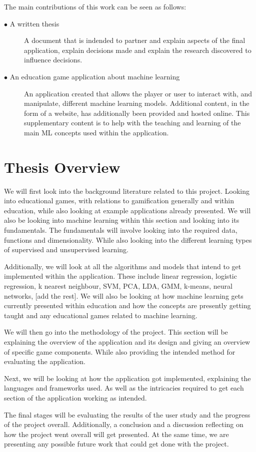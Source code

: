 		The main contributions of this work can be seen as follows:
		
		\begin{description}	
		
			\item[$\bullet$ A written thesis]\hfill
			
			A document that is indended to partner and explain aspects of the final application, explain decisions made and explain the research discovered to influence decisions. 
			
			\item[$\bullet$ An education game application about machine learning]\hfill
			
			An application created that allows the player or user to interact with, and manipulate, different machine learning models. Additional content, in the form of a website, has additionally been provided and hosted online. This supplementary content is to help with the teaching and learning of the main ML concepts used within the application.
			
			
		\end{description}
	
	\section{Thesis Overview}  
	\label{sec:intro_thesis_overview} 
	We will first look into the background literature related to this project. Looking into educational games, with relations to gamification generally and within education, while also looking at example applications already presented. We will also be looking into machine learning within this section and looking into its fundamentals. The fundamentals will involve looking into the required data, functions and dimensionality. While also looking into the different learning types of supervised and unsupervised learning.
	
	Additionally, we will look at all the algorithms and models that intend to get implemented within the application. These include linear regression, logistic regression, k nearest neighbour, SVM, PCA, LDA, GMM, k-means, neural networks, [add the rest]. We will also be looking at how machine learning gets currently presented within education and how the concepts are presently getting taught and any educational games related to machine learning.
	
	We will then go into the methodology of the project. This section will be explaining the overview of the application and its design and giving an overview of specific game components. While also providing the intended method for evaluating the application.
	
	Next, we will be looking at how the application got implemented, explaining the languages and frameworks used. As well as the intricacies required to get each section of the application working as intended. 
	
	The final stages will be evaluating the results of the user study and the progress of the project overall. Additionally, a conclusion and a discussion reflecting on how the project went overall will get presented. At the same time, we are presenting any possible future work that could get done with the project.
	
	